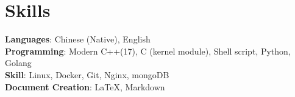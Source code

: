 \documentclass[A4,11pt]{article}
\begin{document}

\section{Skills}
\begin{itemize}[leftmargin=0.5cm, label={}]
  \small{\item{
        \textbf{Languages}{: Chinese (Native), English} \\
        \textbf{Programming}{: Modern C++(17), C (kernel module), Shell script, Python, Golang } \\
        \textbf{Skill}{: Linux, Docker, Git, Nginx, mongoDB } \\
        \textbf{Document Creation}{: \LaTeX, Markdown} \\
        }}
\end{itemize}

\end{document}
